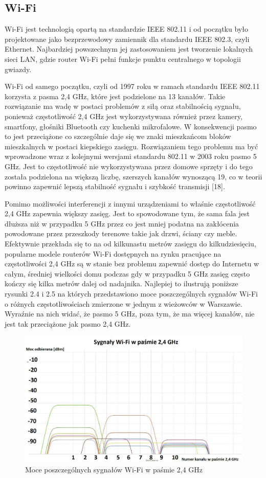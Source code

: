 \documentclass[12pt, twoside, openany]{mwrep}
\begin{document}
\subsection{Wi-Fi}

Wi-Fi jest technologią opartą na standardzie IEEE 802.11 i od początku było projektowane jako bezprzewodowy zamiennik dla standardu IEEE 802.3, czyli Ethernet. Najbardziej powszechnym jej zastosowaniem jest tworzenie lokalnych sieci LAN, gdzie router Wi-Fi pełni funkcje punktu centralnego w topologii gwiazdy. 
\par
Wi-Fi od samego początku, czyli od 1997 roku w ramach standardu IEEE 802.11 korzysta z pasma 2,4 GHz, które jest podzielone na 13 kanałów. Takie rozwiązanie ma wadę w postaci problemów z siłą oraz stabilnością sygnału, ponieważ częstotliwość 2,4 GHz jest wykorzystywana również przez kamery, smartfony, głośniki Bluetooth czy kuchenki mikrofalowe. W konsekwencji pasmo to jest przeciążone co szczególnie daje się we znaki mieszkańcom bloków mieszkalnych w postaci kiepskiego zasięgu. Rozwiązaniem tego problemu ma być wprowadzone wraz z kolejnymi wersjami standardu 802.11 w 2003 roku pasmo 5 GHz. Jest to częstotliwość nie wykorzystywana przez domowe sprzęty i do tego została podzielona na większą liczbę, szerszych kanałów wynoszącą 19, co w teorii powinno zapewnić lepszą stabilność sygnału i szybkość transmisji [18]. 
\par
Pomimo możliwości interferencji z innymi urządzeniami to właśnie częstotliwość 2,4 GHz zapewnia większy zasięg. Jest to spowodowane tym, że sama fala jest dłuższa niż w przypadku 5 GHz przez co jest mniej podatna na zakłócenia powodowane przez przeszkody terenowe takie jak drzwi, ściany czy meble. Efektywnie przekłada się to na od kilkunastu metrów zasięgu do kilkudziesięciu, popularne modele routerów Wi-Fi dostępnych na rynku pracujące na częstotliwości 2,4 GHz są w stanie bez problemu zapewnić dostęp do Internetu w całym, średniej wielkości domu podczas gdy w przypadku 5 GHz zasięg często kończy się kilka metrów dalej od nadajnika. Najlepiej to ilustrują poniższe rysunki 2.4 i 2.5 na których przedstawiono moce poszczególnych sygnałów Wi-Fi o różnych częstotliwościach zmierzone w jednym z wieżowców w Warszawie. Wyraźnie na nich widać, że pasmo 5 GHz, poza tym, że ma więcej kanałów, nie jest tak przeciążone jak pasmo 2,4 GHz.
\hfill \break
\begin{figure}[H]
\centering
\includegraphics[scale=0.35]{2,4GHz}
\caption{Moce poszczególnych sygnałów Wi-Fi w paśmie 2,4 GHz}
\end{figure}
\end{document}

